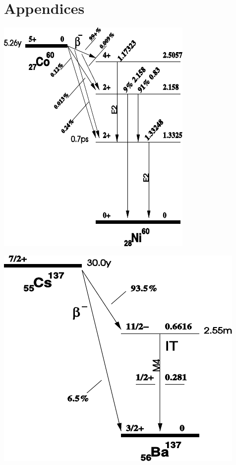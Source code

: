 \newpage
%
\section*{Appendices}
%
\vspace{10mm}
%
\begin{multicols}{2}
%
\minipage{\linewidth}
    \begin{center}
        \captionsetup{type=figure}
        \begin{adjustbox}{max width=\linewidth, keepaspectratio}
            \includegraphics[]{pdf/DecayScheme60Co}
        \end{adjustbox}
        \label{fig:60CoDecayScheme}
    \end{center}
\endminipage
%
\vspace{10mm}
%
\minipage{\linewidth}
    \begin{center}
        \captionsetup{type=figure}
        \begin{adjustbox}{max width=\linewidth, keepaspectratio}
            \includegraphics[]{pdf/DecayScheme137Cs}

\end{adjustbox}
\end{center}
\end{multicols}
